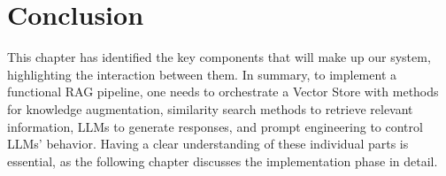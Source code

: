 \section{Conclusion}
This chapter has identified the key components that will make up our system, highlighting the interaction between them. In summary, to implement a functional RAG pipeline, one needs to orchestrate a Vector Store with methods for knowledge augmentation, similarity search methods to retrieve relevant information, LLMs to generate responses, and prompt engineering to control LLMs' behavior.\newline
Having a clear understanding of these individual parts is essential, as the following chapter discusses the implementation phase in detail.